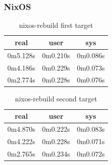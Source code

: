 \documentclass[10pt,]{report}
\begin{document}
\begin{adjustwidth}{20pt}{}
	\subsubsection{NixOS}
	\begin{table}[H]
		\caption{nixos-rebuild first target}
		\begin{center}
			\begin{tabular}[c]{|c|c|c|}
				\hline
				\multicolumn{1}{|c|}{\textbf{real}} &
				\multicolumn{1}{c|}{\textbf{user}}  &
				\multicolumn{1}{c|}{\textbf{sys}}                         \\
				\hline
				0m5.128s                            & 0m0.210s & 0m0.086s \\
				\hline
				0m4.186s                            & 0m0.229s & 0m0.073s \\
				\hline
				0m2.774s                            & 0m0.228s & 0m0.076s \\
				\hline
			\end{tabular}
		\end{center}
	\end{table}
	\begin{table}[H]
		\caption{nixos-rebuild second target}
		\begin{center}
			\begin{tabular}[c]{|c|c|c|}
				\hline
				\multicolumn{1}{|c|}{\textbf{real}} &
				\multicolumn{1}{c|}{\textbf{user}}  &
				\multicolumn{1}{c|}{\textbf{sys}}                         \\
				\hline
				0m4.870s                            & 0m0.222s & 0m0.083s \\
				\hline
				0m4.222s                            & 0m0.228s & 0m0.071s \\
				\hline
				0m2.765s                            & 0m0.234s & 0m0.072s \\
				\hline
			\end{tabular}
		\end{center}
	\end{table}

\end{adjustwidth}
\end{document}
